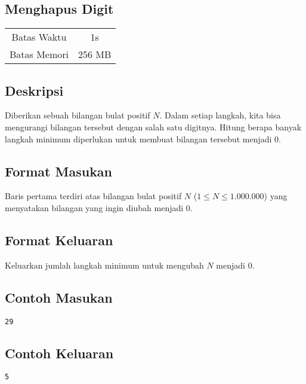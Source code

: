 \documentclass{article}
\begin{document}
\begin{center}

    
    \section*{Menghapus Digit} %

    \begin{tabular}{ | c c | }
        \hline
        Batas Waktu  & 1s \\    %
        Batas Memori & 256 MB \\  %
        \hline
    \end{tabular}
\end{center}

\subsection*{Deskripsi}

Diberikan sebuah bilangan bulat positif $N$. Dalam setiap langkah, kita bisa mengurangi bilangan tersebut dengan salah satu digitnya. Hitung berapa banyak langkah minimum diperlukan untuk membuat bilangan tersebut menjadi 0.
\subsection*{Format Masukan}

Baris pertama terdiri atas bilangan bulat positif $N$ ($1 \leq N \leq 1.000.000$) yang menyatakan bilangan yang ingin diubah menjadi 0.

\subsection*{Format Keluaran}

Keluarkan jumlah langkah minimum untuk mengubah $N$ menjadi 0.

\begin{multicols}{2}
\subsection*{Contoh Masukan}
\begin{lstlisting}
29
\end{lstlisting}
\columnbreak
\subsection*{Contoh Keluaran}
\begin{lstlisting}
5
\end{lstlisting}
\vfill
\null
\end{multicols}
\end{document}
